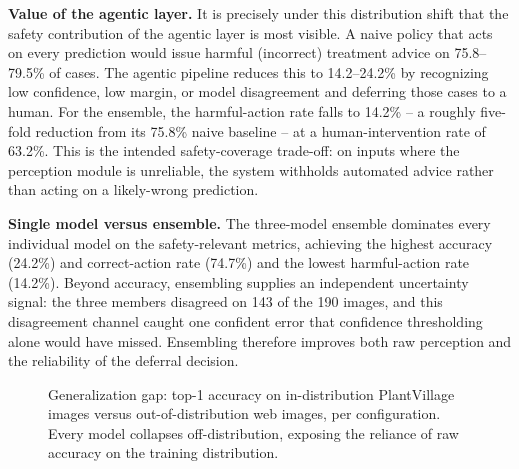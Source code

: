 \documentclass[conference]{IEEEtran}
\begin{document}
\textbf{Value of the agentic layer.} It is precisely under this distribution shift that the safety contribution of the agentic layer is most visible. A naive policy that acts on every prediction would issue harmful (incorrect) treatment advice on 75.8--79.5\% of cases. The agentic pipeline reduces this to 14.2--24.2\% by recognizing low confidence, low margin, or model disagreement and deferring those cases to a human. For the ensemble, the harmful-action rate falls to 14.2\% -- a roughly five-fold reduction from its 75.8\% naive baseline -- at a human-intervention rate of 63.2\%. This is the intended safety-coverage trade-off: on inputs where the perception module is unreliable, the system withholds automated advice rather than acting on a likely-wrong prediction.

\textbf{Single model versus ensemble.} The three-model ensemble dominates every individual model on the safety-relevant metrics, achieving the highest accuracy (24.2\%) and correct-action rate (74.7\%) and the lowest harmful-action rate (14.2\%). Beyond accuracy, ensembling supplies an independent uncertainty signal: the three members disagreed on 143 of the 190 images, and this disagreement channel caught one confident error that confidence thresholding alone would have missed. Ensembling therefore improves both raw perception and the reliability of the deferral decision.

\begin{figure}[t]
\centering
{}
\caption{Generalization gap: top-1 accuracy on in-distribution PlantVillage images versus out-of-distribution web images, per configuration. Every model collapses off-distribution, exposing the reliance of raw accuracy on the training distribution.}
\label{fig:gap}
\end{figure}
\end{document}
